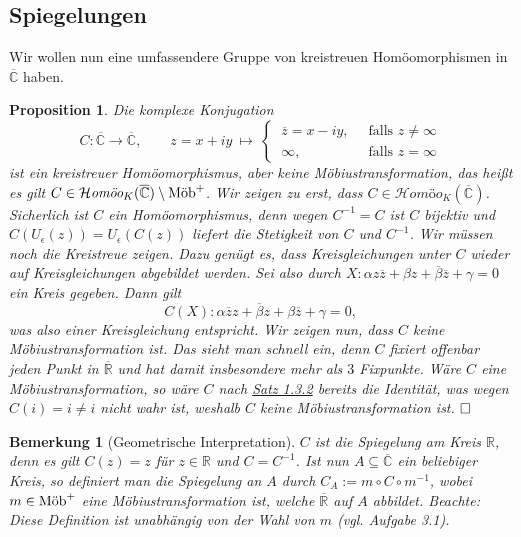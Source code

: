 \documentclass[11pt]{book}
\numberwithin{dummy}{section}
\newtheorem{proposition}[theorem]{Proposition}
\newtheorem{remark}[theorem]{Bemerkung}
\theoremstyle{nonumberbreak}
\newenvironment{pr}[1][]{\ifthenelse{\equal{#1}{}}{\proof}{\proof[#1]}\rm}{\endproof}
\newcommand{\CC}{\overline{\mathbb{C}}}
\newcommand{\la}{\longrightarrow}
\newcommand{\homoekcc}{\mathcal{H}\textit{omöo}_K(\CC)}
\newcommand{\mob}{\textup{Möb}^+}
\begin{document}
\begin{spacing}{1.4}
\section{Spiegelungen} %





Wir wollen nun eine umfassendere Gruppe von kreistreuen Homöomorphismen in $\CC$ haben.


\hypertarget{propeinssechseins}{}
\begin{proposition}    %
Die komplexe Konjugation
$$C: \CC \la \CC, \qquad z=x+iy\ \mapsto \ \begin{cases} \ \overline{z} = x-iy, & \ \textrm{ falls } z \neq \infty \\ \ \infty, & \ \textrm{ falls } z= \infty \end{cases}$$
ist ein kreistreuer Homöomorphismus, aber keine Möbiustransformation, das heißt es gilt $C \in \homoekcc \setminus \mob$. 
\begin{pr}
Wir zeigen zu erst, dass $C \in \homoekcc$. Sicherlich ist $C$ ein Homöomorphismus, denn wegen $C^{-1}=C$ ist $C$ bijektiv und $C(U_{\epsilon}(z)) = U_{\epsilon}(C(z))$ liefert die Stetigkeit von $C$ und $C^{-1}$. Wir müssen noch die Kreistreue zeigen. Dazu genügt es, dass Kreisgleichungen unter $C$ wieder auf Kreisgleichungen abgebildet werden. Sei also durch $X:\alpha z \overline{z} + \beta z + \overline{\beta} \overline{z} + \gamma =0$ ein Kreis gegeben. Dann gilt 
$$C(X): \alpha \overline{z} z + \overline{\beta} z + \beta \overline{z} + \gamma=0,$$
was also einer Kreisgleichung entspricht. Wir zeigen nun, dass $C$ keine Möbiustransformation ist. Das sieht man schnell ein, denn $C$ fixiert offenbar jeden Punkt in $\overline{\mathbb{R}}$ und hat damit insbesondere mehr als $3$ Fixpunkte. Wäre $C$ eine Möbiustransformation, so wäre $C$ nach \hyperlink{satzeinsdreizwei}{Satz 1.3.2} bereits die Identität, was wegen $C(i)=i \neq i$ nicht wahr ist, weshalb $C$ keine Möbiustransformation ist. $\hfill \Box$

\end{pr}
\end{proposition}

\begin{remark}[Geometrische Interpretation]
$C$ ist die Spiegelung am Kreis $\mathbb{R}$, denn es gilt $C(z)=z$ für $z \in \mathbb{R}$ und $C=C^{-1}$. Ist nun $A \subseteq \CC$ ein beliebiger Kreis, so definiert man die Spiegelung an $A$ durch $C_A := m \circ C \circ m^{-1}$, wobei $m \in \mob$ eine Möbiustransformation ist, welche $\overline{\mathbb{R}}$ auf $A$ abbildet. Beachte: Diese Definition ist unabhängig von der Wahl von $m$ (vgl. Aufgabe 3.1).


\end{remark}
\end{spacing}
\end{document}
